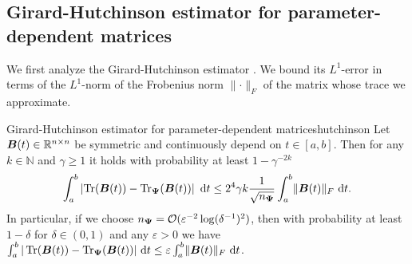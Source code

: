 \documentclass[12pt]{article}
\begin{document}
%

\subsection{Girard-Hutchinson estimator for parameter-dependent matrices}
\label{subsec:hutchinson}

We first analyze the Girard-Hutchinson estimator . We bound its $L^1$-error in terms of the $L^1$-norm of the Frobenius norm $\lVert \cdot \rVert _F$ of the matrix whose trace we approximate.

\begin{theorem}{Girard-Hutchinson estimator for parameter-dependent matrices}{hutchinson}
    Let $\boldsymbol{B}(t) \in \mathbb{R}^{n \times n}$ be symmetric and continuously depend on $t \in [a, b]$. Then for any $k \in \mathbb{N}$ and $\gamma \geq 1$ it holds with probability at least $1 - \gamma^{-2k}$
    \begin{equation}
        \int_{a}^{b} \left| \operatorname{Tr}(\boldsymbol{B}(t)) - \operatorname{Tr}_{\boldsymbol{\Psi}}(\boldsymbol{B}(t)) \right| ~\mathrm{d}t \leq 2^4 \gamma k \frac{1}{\sqrt{n_{\boldsymbol{\Psi}}}} \int_{a}^{b} \lVert \boldsymbol{B}(t) \rVert _F  ~\mathrm{d}t.
    \end{equation}
    In particular, if we choose $n_{\boldsymbol{\Psi}} = \mathcal{O}(\varepsilon^{-2} \log(\delta^{-1})^2)$, then with probability at least $1-\delta$ for $\delta \in (0, 1)$ and any $\varepsilon > 0$ we have $\int_{a}^{b} | \operatorname{Tr}(\boldsymbol{B}(t)) - \operatorname{Tr}_{\boldsymbol{\Psi}}(\boldsymbol{B}(t)) | ~\mathrm{d}t \leq \varepsilon \int_{a}^{b} \lVert \boldsymbol{B}(t) \rVert _F~\mathrm{d}t$.
\end{theorem}
\end{document}
